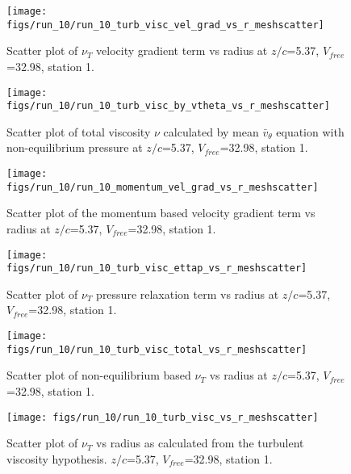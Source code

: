 \begin{figure}[H]
\centering
\texttt{[image: figs/run\_10/run\_10\_turb\_visc\_vel\_grad\_vs\_r\_meshscatter]}
\caption{Scatter plot of $\nu_T$ velocity gradient term vs radius at $z/c$=5.37, $V_{free}$=32.98, station 1.}
\end{figure}


\begin{figure}[H]
\centering
\texttt{[image: figs/run\_10/run\_10\_turb\_visc\_by\_vtheta\_vs\_r\_meshscatter]}
\caption{Scatter plot of total viscosity $\nu$ calculated by mean $\bar{v}_{\theta}$ equation with non-equilibrium pressure at $z/c$=5.37, $V_{free}$=32.98, station 1.}
\end{figure}


\begin{figure}[H]
\centering
\texttt{[image: figs/run\_10/run\_10\_momentum\_vel\_grad\_vs\_r\_meshscatter]}
\caption{Scatter plot of the momentum based velocity gradient term vs radius at $z/c$=5.37, $V_{free}$=32.98, station 1.}
\end{figure}


\begin{figure}[H]
\centering
\texttt{[image: figs/run\_10/run\_10\_turb\_visc\_ettap\_vs\_r\_meshscatter]}
\caption{Scatter plot of $\nu_T$ pressure relaxation term vs radius at $z/c$=5.37, $V_{free}$=32.98, station 1.}
\end{figure}


\begin{figure}[H]
\centering
\texttt{[image: figs/run\_10/run\_10\_turb\_visc\_total\_vs\_r\_meshscatter]}
\caption{Scatter plot of non-equilibrium based $\nu_T$ vs radius at $z/c$=5.37, $V_{free}$=32.98, station 1.}
\end{figure}


\begin{figure}[H]
\centering
\texttt{[image: figs/run\_10/run\_10\_turb\_visc\_vs\_r\_meshscatter]}
\caption{Scatter plot of $\nu_T$ vs radius as calculated from the turbulent viscosity hypothesis. $z/c$=5.37, $V_{free}$=32.98, station 1.}
\end{figure}



